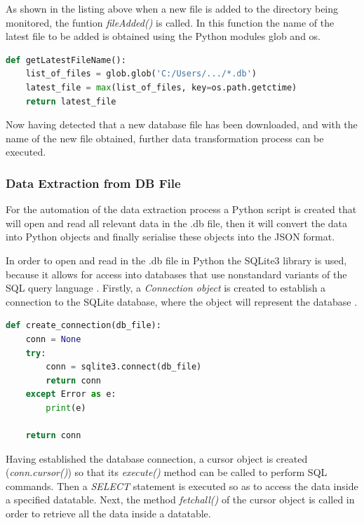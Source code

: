 As shown in the listing above when a new file is added to the directory being monitored, the funtion \textit{fileAdded()} is called. In this function the name of the latest file to be added is obtained using the Python modules glob and os. 

\begin{lstlisting}[language=Python, caption={Getting The Latest File Name Code Snippet}, label={lst:watchodog}]
def getLatestFileName():
    list_of_files = glob.glob('C:/Users/.../*.db')
    latest_file = max(list_of_files, key=os.path.getctime)
    return latest_file
\end{lstlisting}

Now having detected that a new database file has been downloaded, and with the name of the new file obtained, further data transformation process can be executed. 

\subsubsection{Data Extraction from DB File}

For the automation of the data extraction process a Python script is created that will open and read all relevant data in the .db file, then it will convert the data into Python objects and finally serialise these objects into the JSON format. 

In order to open and read in the .db file in Python the SQLite3 library is used, because it allows for access into databases that use nonstandard variants of the SQL query language \cite{sqlite3}. Firstly, a \textit{Connection object} is created to establish a connection to the SQLite database, where the object will represent the database \cite{sqlitePython1}. 

\begin{lstlisting}[language=Python, caption={SQLite3 Database Connection Object Code Snippet}, label={lst:Connection Object}]
def create_connection(db_file): 
    conn = None
    try:
        conn = sqlite3.connect(db_file) 
        return conn
    except Error as e:
        print(e)
    
    return conn
\end{lstlisting}

Having established the database connection, a cursor object is created (\textit{conn.cursor()}) so that its \textit{execute()} method can be called to perform SQL commands. Then a \textit{SELECT} statement is executed so as to access the data inside a specified datatable. Next, the method \textit{fetchall()} of the cursor object is called in order to retrieve all the data inside a datatable. 

